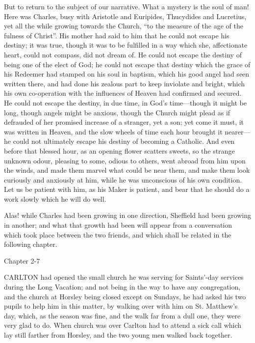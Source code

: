 But to return to the subject of our narrative. What a mystery is
the soul of man! Here was Charles, busy with Aristotle and Euripides,
Thucydides and Lucretius, yet all the while growing towards the
Church, ``to the measure of the age of the fulness of
Christ''. His mother had said to him that he could not escape his
destiny; it was true, though it was to be fulfilled in a way which
she, affectionate heart, could not compass, did not dream of. He could
not escape the destiny of being one of the elect of God; he could not
escape that destiny which the grace of his Redeemer had stamped on his
soul in baptism, which his good angel had seen written there, and had
done his zealous part to keep inviolate and bright, which his own
co-operation with the influences of Heaven had confirmed and secured.
He could not escape the destiny, in due time, in God's time—though
it might be long, though angels might be anxious, though the Church
might plead as if defrauded of her promised increase of a stranger,
yet a son; yet come it must, it was written in Heaven, and the slow
wheels of time each hour brought it nearer—he could not ultimately
escape his destiny of becoming a Catholic. And even before that
blessed hour, as an opening flower scatters sweets, so the strange
unknown odour, pleasing to some, odious to others, went abroad from
him upon the winds, and made them marvel what could be near
them, and make them look curiously and anxiously at him, while he was
unconscious of his own condition. Let us be patient with him, as his
Maker is patient, and bear that he should do a work slowly which he
will do well.

Alas! while Charles had been growing in one direction, Sheffield
had been growing in another; and what that growth had been will appear
from a conversation which took place between the two friends, and
which shall be related in the following chapter.

Chapter 2-7


CARLTON had opened the small church he
was serving for Saints'-day services during the Long Vacation; and not
being in the way to have any congregation, and the church at Horsley
being closed except on Sundays, he had asked his two pupils to help
him in this matter, by walking over with him on St. Matthew's day,
which, as the season was fine, and the walk far from a dull one, they
were very glad to do. When church was over Carlton had to attend a
sick call which lay still farther from Horsley, and the two young men
walked back together.

